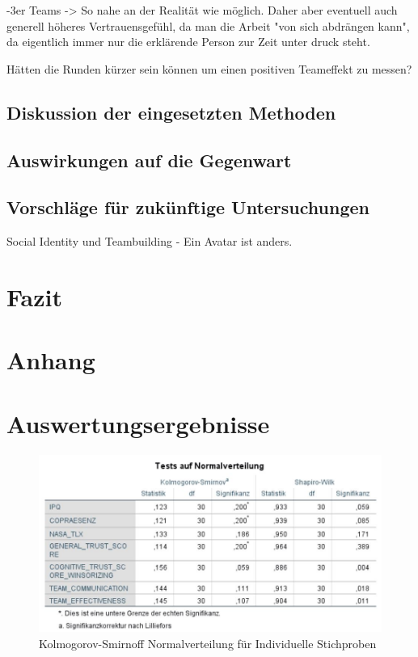 \documentclass[a4paper,11pt]{article}%
\renewcommand{\\}{\vspace*{0.5\baselineskip} \newline}
\begin{document}
-3er Teams -> So nahe an der Realität wie möglich. Daher aber eventuell auch generell höheres Vertrauensgefühl, da man die Arbeit "von sich abdrängen kann", da eigentlich immer nur die erklärende Person zur Zeit unter druck steht.

Hätten die Runden kürzer sein können um einen positiven Teameffekt zu messen?

	\subsection{Diskussion der eingesetzten Methoden}
	\subsection{Auswirkungen auf die Gegenwart}
	\subsection{Vorschläge für zukünftige Untersuchungen}
		Social Identity und Teambuilding - Ein Avatar ist anders.
	
\section{Fazit}
\newpage




	\newpage
	\appendix	
\section*{Anhang}

\section{Auswertungsergebnisse}
	
	\begin{figure}[H]
	\centering
		\begin{footnotesize}
			\includegraphics[scale=0.6]{Abbildungen/Post_QuestionnaireStatistiks/Normalverteilung_30}
			
			\caption{Kolmogorov-Smirnoff Normalverteilung für Individuelle Stichproben}
			\label{fig:KolSmirInd}
		\end{footnotesize}
	\end{figure}	
	
\end{document}
